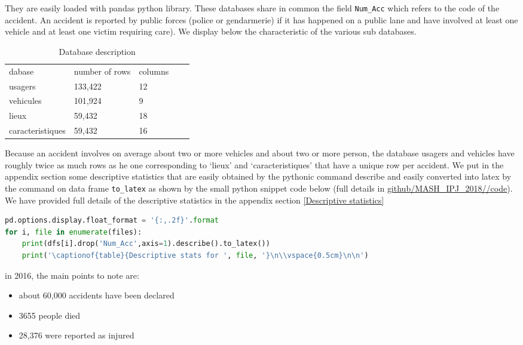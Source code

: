 \documentclass[a4paper]{article}
\theoremstyle{definition}
\theoremstyle{proposition}
\begin{document}
They are easily loaded with pandas python library. These databases share in common the field \verb |Num_Acc| which refers to the code of the accident. An accident is reported by public forces (police or gendarmerie) if it has happened on a public lane and have involved at least one vehicle and at least one victim requiring care). We display below the characteristic of the various sub databases.
\begin{table}[H]
\centering
\caption{Database description}
\label{db_description}
\begin{tabular}{lllll}
dabase 		& number of rows & columns \\
usagers  		& 133,422 	& 12 \\
vehicules 		& 101,924	&  9 \\
lieux			&  59,432	& 18 \\
caracteristiques	&  59,432	& 16 
\end{tabular}
\end{table}

Because an accident involves on average about two or more vehicles and about two or more person, the database usagers and vehicles have roughly twice as much rows as he one corresponding to `lieux' and `caracteristiques' that have a unique row per accident. We put in the appendix section some descriptive statistics that are easily obtained by the pythonic command describe and easily converted into latex by the command on data frame \verb|to_latex| as shown by the small python snippet code below (full details in \href{https://github.com/ericbenhamou/MASH_IPJ_2018/tree/master/code}{github/MASH\_IPJ\_2018//code}). We have provided full details of the descriptive statistics in the appendix section \ref{Descriptive statistics}

\begin{lstlisting}[language=Python]
pd.options.display.float_format = '{:,.2f}'.format
for i, file in enumerate(files):
    print(dfs[i].drop('Num_Acc',axis=1).describe().to_latex())
    print('\captionof{table}{Descriptive stats for ', file, '}\n\\vspace{0.5cm}\n\n')
\end{lstlisting}
\bigskip

in 2016, the main points to note are:
\begin{itemize}
\item about 60,000 accidents have been declared
\item 3655 people died
\item 28,376 were reported as injured
\end{itemize}
\end{document}

